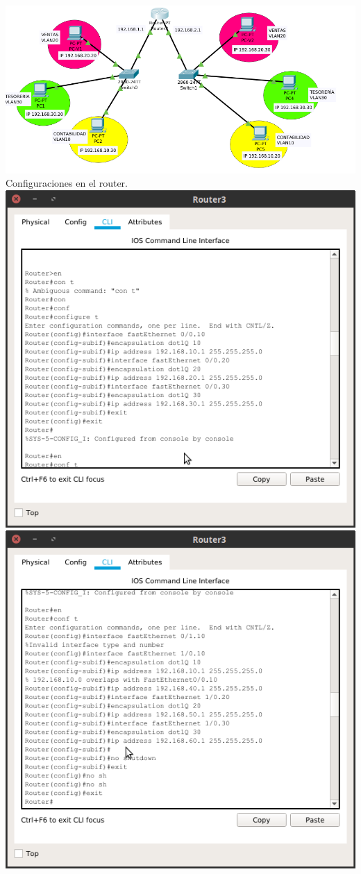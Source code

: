 \includegraphics[scale=0.5]{img/routing.png} 
Configuraciones en el router.\\
\includegraphics[scale=0.5]{img/1ra.png} \\
\includegraphics[scale=0.5]{img/2da.png} 
